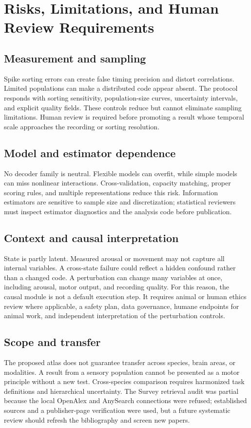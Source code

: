 \documentclass[conference]{IEEEtran}
\begin{document}
\section{Risks, Limitations, and Human Review Requirements}
\subsection{Measurement and sampling}
Spike sorting errors can create false timing precision and distort correlations. Limited populations can make a distributed code appear absent. The protocol responds with sorting sensitivity, population-size curves, uncertainty intervals, and explicit quality fields. These controls reduce but cannot eliminate sampling limitations. Human review is required before promoting a result whose temporal scale approaches the recording or sorting resolution.

\subsection{Model and estimator dependence}
No decoder family is neutral. Flexible models can overfit, while simple models can miss nonlinear interactions. Cross-validation, capacity matching, proper scoring rules, and multiple representations reduce this risk. Information estimators are sensitive to sample size and discretization; statistical reviewers must inspect estimator diagnostics and the analysis code before publication.

\subsection{Context and causal interpretation}
State is partly latent. Measured arousal or movement may not capture all internal variables. A cross-state failure could reflect a hidden confound rather than a changed code. A perturbation can change many variables at once, including arousal, motor output, and recording quality. For this reason, the causal module is not a default execution step. It requires animal or human ethics review where applicable, a safety plan, data governance, humane endpoints for animal work, and independent interpretation of the perturbation controls.

\subsection{Scope and transfer}
The proposed atlas does not guarantee transfer across species, brain areas, or modalities. A result from a sensory population cannot be presented as a motor principle without a new test. Cross-species comparison requires harmonized task definitions and hierarchical uncertainty. The Survey retrieval audit was partial because the local OpenAlex and AnySearch connections were refused; established sources and a publisher-page verification were used, but a future systematic review should refresh the bibliography and screen new papers.
\end{document}
